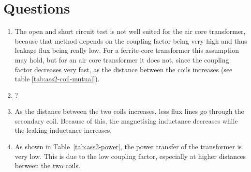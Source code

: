 \documentclass[11pt,titlepage]{report}
\begin{document}
\section*{Questions}
\begin{enumerate}
\item
The open and short circuit test is not well suited for the air core transformer, because that method depends on the coupling factor being very high and thus leakage flux being really low. For a ferrite-core transformer this assumption may hold, but for an air core transformer it does not, since the coupling factor decreases very fast, as the distance between the coils increases (see table \ref{tab:ass2-coil-mutual}).

\item
? %

\item
As the distance between the two coils increases, less flux lines go through the secondary coil. Because of this, the magnetising inductance decreases while the leaking inductance increases. %

\item
As shown in Table~\ref{tab:ass2-power}, the power transfer of the transformer is very low. This is due to the low coupling factor, especially at higher distances between the two coils.
\end{enumerate}
\end{document}
